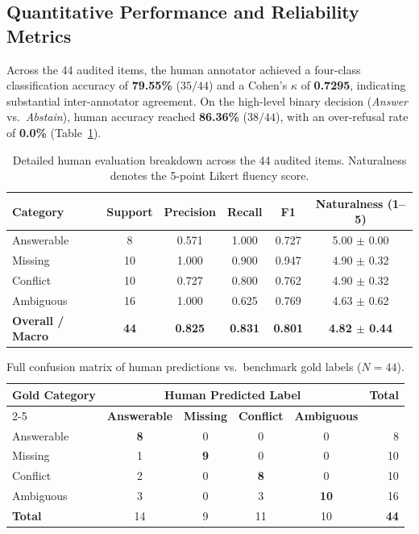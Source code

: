 \documentclass[11pt,letterpaper]{article}
\begin{document}
\subsection{Quantitative Performance and Reliability Metrics}
Across the 44 audited items, the human annotator achieved a four-class classification accuracy of \textbf{79.55\%} ($35/44$) and a Cohen's $\kappa$ of \textbf{0.7295}, indicating substantial inter-annotator agreement. On the high-level binary decision (\textit{Answer} vs.\ \textit{Abstain}), human accuracy reached \textbf{86.36\%} ($38/44$), with an over-refusal rate of \textbf{0.0\%} (Table~\ref{tab:human_evaluation_detailed}).

\begin{table}[h]
\centering
\small
\caption{Detailed human evaluation breakdown across the 44 audited items. Naturalness denotes the 5-point Likert fluency score.}
\label{tab:human_evaluation_detailed}
\begin{tabular}{lccccc}
\toprule
\textbf{Category} & \textbf{Support} & \textbf{Precision} & \textbf{Recall} & \textbf{F1} & \textbf{Naturalness (1--5)} \\
\midrule
Answerable & 8  & 0.571 & 1.000 & 0.727 & 5.00 $\pm$ 0.00 \\
Missing    & 10 & 1.000 & 0.900 & 0.947 & 4.90 $\pm$ 0.32 \\
Conflict   & 10 & 0.727 & 0.800 & 0.762 & 4.90 $\pm$ 0.32 \\
Ambiguous  & 16 & 1.000 & 0.625 & 0.769 & 4.63 $\pm$ 0.62 \\
\midrule
\textbf{Overall / Macro} & \textbf{44} & \textbf{0.825} & \textbf{0.831} & \textbf{0.801} & \textbf{4.82 $\pm$ 0.44} \\
\bottomrule
\end{tabular}
\end{table}

\begin{table}[h]
\centering
\small
\caption{Full confusion matrix of human predictions vs.\ benchmark gold labels ($N=44$).}
\label{tab:human_confusion}
\begin{tabular}{lccccr}
\toprule
\textbf{Gold Category} & \multicolumn{4}{c}{\textbf{Human Predicted Label}} & \textbf{Total} \\
\cmidrule(lr){2-5}
& \textbf{Answerable} & \textbf{Missing} & \textbf{Conflict} & \textbf{Ambiguous} & \\
\midrule
Answerable & \textbf{8} & 0 & 0 & 0 & 8 \\
Missing    & 1 & \textbf{9} & 0 & 0 & 10 \\
Conflict   & 2 & 0 & \textbf{8} & 0 & 10 \\
Ambiguous  & 3 & 0 & 3 & \textbf{10} & 16 \\
\midrule
\textbf{Total} & 14 & 9 & 11 & 10 & \textbf{44} \\
\bottomrule
\end{tabular}
\end{table}
\end{document}

